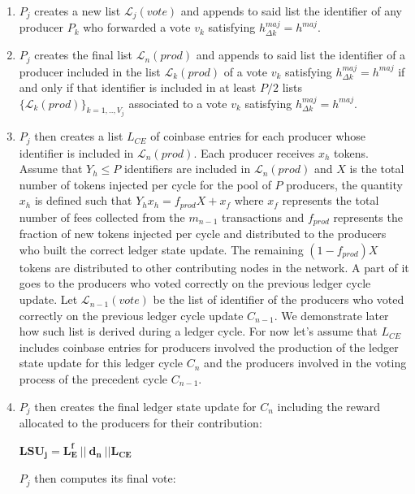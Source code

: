 \begin{enumerate}
\item $P_j$ creates a new list $\mathcal{L}_j(vote)$ and appends to said list the identifier of any producer $P_k$ who forwarded a vote $v_k$ satisfying $h^{maj}_{\Delta k} = h^{maj}$.
\item $P_j$ creates the final list $\mathcal{L}_n(prod)$ and appends to said list  the identifier of a producer included in the list $\mathcal{L}_k(prod)$ of a vote $v_k$ satisfying $h^{maj}_{\Delta k} = h^{maj}$ if and only if that identifier is included in at least $P/2$ lists $\{\mathcal{L}_{k}(prod)\}_{k=1,..,V_j}$ associated to a vote $v_{k}$ satisfying $h^{maj}_{\Delta k} = h^{maj}$. 
\item $P_j$ then creates a list $L_{CE}$ of coinbase entries for each producer whose identifier is included in $\mathcal{L}_n(prod)$. Each producer receives $x_h$ tokens. Assume that $Y_h \leq P$ identifiers are included in $\mathcal{L}_n(prod)$ and $X$ is the total number of tokens injected per cycle for the pool of $P$ producers, the quantity $x_h$ is defined such that $Y_hx_h = f_{prod}X + x_f$ where $x_f$ represents the total number of fees collected from the $m_{n-1}$ transactions and $f_{prod}$ represents the fraction of new tokens injected per cycle and distributed to the producers who built the correct ledger state update. The remaining $(1-f_{prod})X$ tokens are distributed to other contributing nodes in the network. A part of it goes to the producers who voted correctly on the previous ledger cycle update. Let $\mathcal{L}_{n-1}(vote)$ be the list of identifier of the producers who voted correctly on the previous ledger cycle update $C_{n-1}$. We demonstrate later how such list is derived during a ledger cycle. For now let's assume that $L_{CE}$ includes coinbase entries for producers involved the production of the ledger state update for this ledger cycle $C_n$ and the producers involved in the voting process of the precedent cycle $C_{n-1}$. 
\item $P_j$ then creates the final ledger state update for $C_n$  including the reward allocated to the producers for their contribution:
\begin{center}
$\mathbf{LSU_j = L^f_E~||~d_n~||L_{CE}}$
\end{center}
$P_j$ then computes its final vote:
\begin{center}
\end{center}


\end{enumerate}
